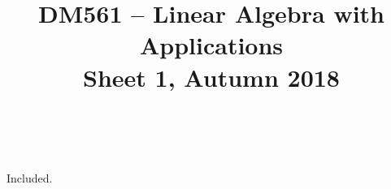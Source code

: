 \documentclass[a4paper,10pt]{article}
\title{%
\begin{flushleft}
DM561 -- Linear Algebra with Applications\\[0.3cm]
{\Large Sheet 1, Autumn 2018} %
\\
\hrulefill
\\[-1.8cm]
\end{flushleft}
}
\author{}
\date{}
\begin{document}
\maketitle


\begin{solution}
Included. 
\end{solution}







\end{document}
